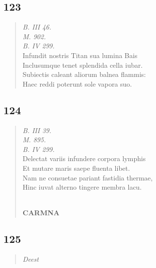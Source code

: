 \documentclass[11pt, a4paper]{report}
\begin{document}
            \subsection*{123}
      \begin{verse}
      \textit{B. III 46.} \\ \textit{M. 902.} \\ \textit{B. IV 299.} \\ Infundit nostris Titan sua lumina Bais \\ Inclusumque tenet splendida cella iubar. \\ Subiectis caleant aliorum balnea flammis: \\ Haec reddi poterunt sole vapora suo. \\ 
      \end{verse}
  
            \subsection*{124}
      \begin{verse}
      \textit{B. III 39.} \\ \textit{M. 895.} \\ \textit{B. IV 299.} \\ Delectat variis infundere corpora lymphis \\ Et mutare maris saepe fluenta libet. \\ Nam ne consuetae pariant fastidia thermae, \\ Hinc iuvat alterno tingere membra lacu. \\ 
        ﻿\pagebreak 
     \marginpar{[136]} \begin{center} \textbf{CARMNA} \end{center}
      \end{verse}
  
            \subsection*{125}
      \begin{verse}
      \textit{Deest} \\ 
      \end{verse}
  
\end{document}
